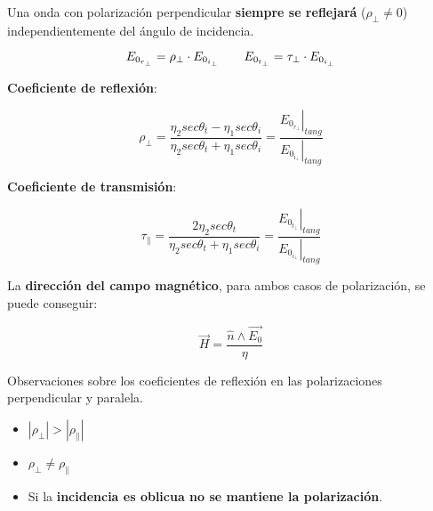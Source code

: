 \documentclass[10pt,landscape]{article}
\begin{document}
\begin{multicols}{3}
Una onda con polarización perpendicular \textbf{siempre se reflejará} ($\rho_\perp \neq 0$) independientemente del ángulo de incidencia.


\begin{equation*}
	E_{0_{r_\perp}} = \rho_\perp \cdot E_{0_{i_\perp}} \hspace{20 pt} E_{0_{t_\perp}} = \tau_\perp \cdot E_{0_{i_\perp}} 
\end{equation*} 

\textbf{Coeficiente de reflexión}:

\begin{equation*}
    \rho_\perp = \frac{\eta_2 sec{\theta_t} - \eta_1 sec{\theta_i}}{\eta_2 sec{\theta_t} + \eta_1 sec{\theta_i}} = \frac{ \left. E_{0_{r_{\perp}}} \right|_{tang} }{ \left. E_{0_{i_{\perp}}} \right|_{tang}}
\end{equation*}

\textbf{Coeficiente de transmisión}:

\begin{equation*}
    \tau_\parallel = \frac{2 \eta_2 sec{\theta_t}}{\eta_2 sec{\theta_t} + \eta_1 sec{\theta_i}} = \frac{ \left. E_{0_{t_{\perp}}} \right|_{tang} }{ \left. E_{0_{i_{\perp}}} \right|_{tang}}
\end{equation*}

La \textbf{dirección del campo magnético}, para ambos casos de polarización, se puede conseguir:

\begin{equation*}
	\vec{H} = \frac{\hat{n} \wedge \vec{E_0}}{\eta}
\end{equation*}

Observaciones sobre los coeficientes de reflexión en las polarizaciones perpendicular y paralela.

\begin{itemize}
	\item $|\rho_\perp| > |\rho_\parallel|$
	\item $\rho_\perp \neq \rho_\parallel$
	\item Si la \textbf{incidencia es oblicua no se mantiene la polarización}.
\end{itemize}

                                                                    


\end{multicols}
\end{document}
